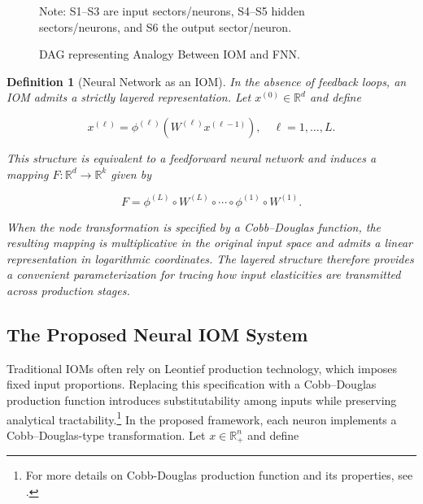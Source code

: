 \documentclass[preprint,12pt,authoryear]{sn-jnl}
\newtheorem{definition}{Definition}
\begin{document}
\begin{figure}[htbp]
\centering
{}
\caption{DAG representing Analogy Between IOM and FNN.}
\label{fig:simple_dag}

{\scriptsize Note: S1--S3 are input sectors/neurons, S4--S5 hidden sectors/neurons, and S6 the output sector/neuron.}
\end{figure}

\begin{definition}[Neural Network as an IOM] \label{def:nn_as_iom}
In the absence of feedback loops, an IOM admits a strictly layered representation. Let $x^{(0)} \in \mathbb{R}^d$ and define

$$
x^{(\ell)} = \phi^{(\ell)}(W^{(\ell)}x^{(\ell-1)}),
\quad \ell = 1,\dots,L.
$$

This structure is equivalent to a feedforward neural network and induces a mapping
$F:\mathbb{R}^d\to\mathbb{R}^k$ given by

$$
F =
\phi^{(L)}\circ W^{(L)}
\circ\cdots\circ
\phi^{(1)}\circ W^{(1)}.
$$

When the node transformation is specified by a Cobb--Douglas function, the resulting mapping is multiplicative in the original input space and admits a linear representation in logarithmic coordinates. The layered structure therefore provides a convenient parameterization for tracing how input elasticities are transmitted across production stages.
\end{definition}


\subsection{The Proposed Neural IOM System}

Traditional IOMs often rely on Leontief production technology, which imposes fixed input proportions. Replacing this specification with a Cobb–Douglas production function introduces substitutability among inputs while preserving analytical tractability.\footnote{For more details on Cobb-Douglas production function and its properties, see \cite{sargent2024economic}.} In the proposed framework, each neuron implements a Cobb--Douglas-type transformation. Let $x \in \mathbb{R}^n_{+}$ and define
\end{document}
